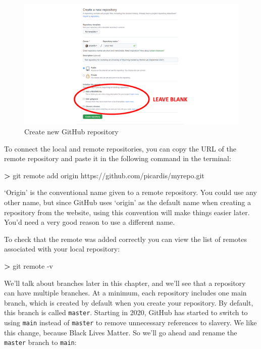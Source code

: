\documentclass[
]{book}
\newenvironment{Shaded}{\begin{snugshade}}{\end{snugshade}}
\newcommand{\FunctionTok}[1]{\textcolor[rgb]{0.00,0.00,0.00}{#1}}
\newcommand{\NormalTok}[1]{#1}
\newcommand{\OperatorTok}[1]{\textcolor[rgb]{0.81,0.36,0.00}{\textbf{#1}}}
\begin{document}
\begin{figure}

{\centering \includegraphics[width=1\linewidth]{img/github-02} 

}

\caption{Create new GitHub repository}\label{fig:github02}
\end{figure}

To connect the local and remote repositories, you can copy the URL of the remote repository and paste it in the following command in the terminal:

\begin{Shaded}
\begin{Highlighting}[]
\OperatorTok{>} \FunctionTok{git}\NormalTok{ remote add origin https://github.com/picardis/myrepo.git}
\end{Highlighting}
\end{Shaded}

`Origin' is the conventional name given to a remote repository. You could use any other name, but since GitHub uses `origin' as the default name when creating a repository from the website, using this convention will make things easier later. You'd need a very good reason to use a different name.

To check that the remote was added correctly you can view the list of remotes associated with your local repository:

\begin{Shaded}
\begin{Highlighting}[]
\OperatorTok{>} \FunctionTok{git}\NormalTok{ remote -v}
\end{Highlighting}
\end{Shaded}

We'll talk about branches later in this chapter, and we'll see that a repository can have multiple branches. At a minimum, each repository includes one main branch, which is created by default when you create your repository. By default, this branch is called \texttt{master}. Starting in 2020, GitHub has started to switch to using \texttt{main} instead of \texttt{master} to remove unnecessary references to slavery. We like this change, because Black Lives Matter. So we'll go ahead and rename the \texttt{master} branch to \texttt{main}:
\end{document}
